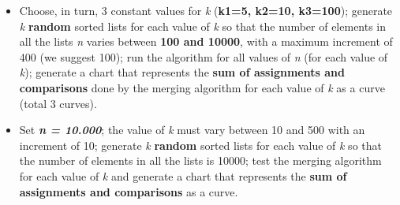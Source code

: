 \documentclass[../en-fa-lab.tex]{subfiles}
\begin{document}
\begin{itemize}
\item
  Choose, in turn, 3 constant values for \emph{k} (\textbf{k1=5, k2=10,
  k3=100}); generate \emph{k} \textbf{random} sorted lists for each
  value of \emph{k} so that the number of elements in all the lists
  \emph{n} varies between \textbf{100 and 10000}, with a maximum
  increment of 400 (we suggest 100); run the algorithm for all values of
  \emph{n} (for each value of \emph{k}); generate a chart that
  represents the \textbf{sum of assignments and comparisons} done by the
  merging algorithm for each value of \emph{k} as a curve (total 3
  curves).
\item
  Set \emph{\textbf{n = 10.000}}; the value of \emph{k} must vary
  between 10 and 500 with an increment of 10; generate \emph{k}
  \textbf{random} sorted lists for each value of \emph{k} so that the
  number of elements in all the lists is 10000; test the merging
  algorithm for each value of \emph{k} and generate a chart that
  represents the \textbf{sum of assignments and comparisons} as a curve.
\end{itemize}
\end{document}
